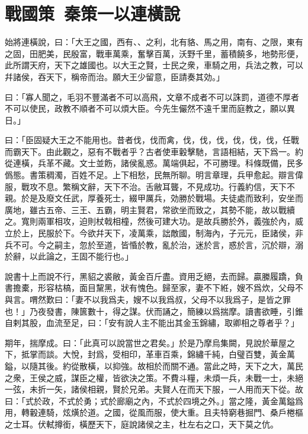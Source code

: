 \section[蘇秦以連橫說秦\quad{\small 戰國策 秦策一}]{{\normalsize 戰國策\ 秦策一}\quad {}以連橫說}
始將連橫說，曰：「大王之國，西有、、之利，北有貉、馬之用，南有、之限，東有
之固，田肥美，民殷富，戰車萬乘，奮擊百萬，沃野千里，蓄積饒多，地勢形便，此所謂天府，天下之雄國也。以大王之賢，士民之衆，車騎之用，兵法之教，可以幷諸侯，吞天下，稱帝而治。願大王少留意，臣請奏其効。」

曰：「寡人聞之，毛羽不豐滿者不可以高飛，文章不成者不可以誅罰，道德不厚者不可以使民，政教不順者不可以煩大臣。今先生儼然不遠千里而庭教之，願以異日。」

曰：「臣固疑大王之不能用也。昔者伐，伐而禽，伐，伐，伐，伐，伐，伐，任戰而霸天下。由此觀之，惡有不戰者乎？古者使車轂擊馳，言語相結，天下爲一。約從連橫，兵革不藏。文士並飭，諸侯亂惑。萬端俱起，不可勝理。科條既備，民多僞態。書策稠濁，百姓不足。上下相愁，民無所聊。明言章理，兵甲愈起。辯言偉服，戰攻不息。繁稱文辭，天下不治。舌敝耳聾，不見成功。行義約信，天下不親。於是及廢文任武，厚養死士，綴甲厲兵，効勝於戰場。夫徒處而致利，安坐而廣地，雖古五帝、三王、五霸，明主賢君，常欲坐而致之，其勢不能，故以戰續之。寬則兩軍相攻，迫則杖戟相橦，然後可建大功。是故兵勝於外，義強於內，威立於上，民服於下。今欲幷天下，凌萬乘，詘敵國，制海內，子元元，臣諸侯，非兵不可。今之嗣主，忽於至道，皆惛於教，亂於治，迷於言，惑於言，沉於辯，溺於辭，以此論之，王固不能行也。」

說書十上而說不行，黑貂之裘敝，黃金百斤盡。資用乏絕，去而歸。贏縢履蹻，負書擔橐，形容枯槁，面目黧黑，狀有愧色。歸至家，妻不下絍，嫂不爲炊，父母不與言。喟然歎曰：「妻不以我爲夫，嫂不以我爲叔，父母不以我爲子，是皆之罪也！」乃夜發書，陳篋數十，得之謀。伏而誦之，簡練以爲揣摩。讀書欲睡，引錐自剌其股，血流至足，曰：「安有說人主不能出其金玉錦繡，取卿相之尊者乎？」

期年，揣摩成。曰：「此真可以說當世之君矣。」於是乃摩烏集闕，見說於華屋之下，抵掌而談。大悅，封爲，受相印，革車百乘，錦繡千純，白璧百雙，黃金萬鎰，以隨其後。約從散橫，以抑強。故相於而關不通。當此之時，天下之大，萬民之衆，王侯之威，謀臣之權，皆欲決之策。不費斗糧，未煩一兵，未戰一士，未絕一弦，未折一矢，諸侯相親，賢於兄弟。夫賢人在而天下服，一人用而天下從。故曰：「式於政，不式於勇；式於廊廟之內，不式於四境之外。」當之隆，黃金萬鎰爲用，轉轂連騎，炫熿於道。之國，從風而服，使大重。且夫特窮巷掘門、桑戶棬樞之士耳。伏軾撙銜，橫歷天下，庭說諸侯之主，杜左右之口，天下莫之伉。

